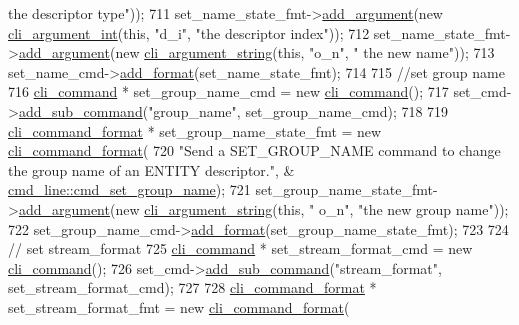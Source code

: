\begin{DoxyCode}
{      the descriptor type"}));
711     set\_name\_state\_fmt->\hyperlink{classcli__command__format_ac3fc6d13a227c195d5ee6f7b78eba9cd}{add\_argument}(\textcolor{keyword}{new} \hyperlink{classcli__argument__int}{cli\_argument\_int}(\textcolor{keyword}{this}, \textcolor{stringliteral}{"d\_i"}, \textcolor{stringliteral}{"the
       descriptor index"}));
712     set\_name\_state\_fmt->\hyperlink{classcli__command__format_ac3fc6d13a227c195d5ee6f7b78eba9cd}{add\_argument}(\textcolor{keyword}{new} \hyperlink{classcli__argument__string}{cli\_argument\_string}(\textcolor{keyword}{this}, \textcolor{stringliteral}{"o\_n"}, \textcolor{stringliteral}{"
      the new name"}));
713     set\_name\_cmd->\hyperlink{classcli__command_aa9ec38e761644d946f8db2b920e39921}{add\_format}(set\_name\_state\_fmt);
714 
715     \textcolor{comment}{//set group name}
716     \hyperlink{classcli__command}{cli\_command} * set\_group\_name\_cmd = \textcolor{keyword}{new} \hyperlink{classcli__command}{cli\_command}();
717     set\_cmd->\hyperlink{classcli__command_aa73a67e8ebb6facd4b40ced66279b226}{add\_sub\_command}(\textcolor{stringliteral}{"group\_name"}, set\_group\_name\_cmd);
718 
719     \hyperlink{classcli__command__format}{cli\_command\_format} * set\_group\_name\_state\_fmt = \textcolor{keyword}{new} 
      \hyperlink{classcli__command__format}{cli\_command\_format}(
720         \textcolor{stringliteral}{"Send a SET\_GROUP\_NAME command to change the group name of an ENTITY descriptor."}, &
      \hyperlink{classcmd__line_af7858348fd722d4f184031bcbdc3fed3}{cmd\_line::cmd\_set\_group\_name});
721     set\_group\_name\_state\_fmt->\hyperlink{classcli__command__format_ac3fc6d13a227c195d5ee6f7b78eba9cd}{add\_argument}(\textcolor{keyword}{new} \hyperlink{classcli__argument__string}{cli\_argument\_string}(\textcolor{keyword}{this}, \textcolor{stringliteral}{"
      o\_n"}, \textcolor{stringliteral}{"the new group name"}));
722     set\_group\_name\_cmd->\hyperlink{classcli__command_aa9ec38e761644d946f8db2b920e39921}{add\_format}(set\_group\_name\_state\_fmt);
723 
724     \textcolor{comment}{// set stream\_format}
725     \hyperlink{classcli__command}{cli\_command} * set\_stream\_format\_cmd = \textcolor{keyword}{new} \hyperlink{classcli__command}{cli\_command}();
726     set\_cmd->\hyperlink{classcli__command_aa73a67e8ebb6facd4b40ced66279b226}{add\_sub\_command}(\textcolor{stringliteral}{"stream\_format"}, set\_stream\_format\_cmd);
727 
728     \hyperlink{classcli__command__format}{cli\_command\_format} * set\_stream\_format\_fmt = \textcolor{keyword}{new} 
      \hyperlink{classcli__command__format}{cli\_command\_format}(

\end{DoxyCode}
